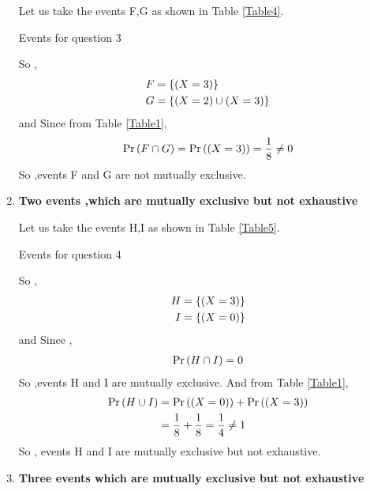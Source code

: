 \documentclass[journal,12pt,twocolumn]{IEEEtran}
\begin{document}
\begin{enumerate}[label=(\roman*)]
    Let us take the events F,G as shown in Table \ref{Table4}.
    \begin{table}[ht!]
        
        \caption{Events for question 3}
        \label{Table4}
    \end{table}
    So ,
    \begin{align}
        F &= \left\{(X=3)\right\} \\
	    G &=  \left\{(X=2) \cup (X=3)\right\}
    \end{align}
    and Since from Table \ref{Table1},
    \begin{align}
        \Pr\left(F \cap G\right) = \Pr\left((X=3)\right) = \dfrac{1}{8} \neq 0
    \end{align}
    So ,events F and G are not mutually exclusive.
  
    \item \textbf{Two events ,which are mutually exclusive but not exhaustive}
    
    Let us take the events H,I as shown in Table \ref{Table5}.
    \begin{table}[ht!]
        
        \caption{Events for question 4}
        \label{Table5}
    \end{table}
    So ,
    \begin{align}
        H &= \left\{ (X=3) \right\} \\
        I &= \left\{ (X=0) \right\}
    \end{align}
    and Since ,
    \begin{align}
        \Pr\left(H \cap I\right) = 0
    \end{align}
    So ,events H and I are mutually exclusive. And from Table \ref{Table1},
    \begin{align}
        \Pr\left(H \cup I\right) &= \Pr\left((X=0)\right) + \Pr\left((X=3)\right) \\
                      &= \dfrac{1}{8} + \dfrac{1}{8} = \dfrac{1}{4} \neq 1
    \end{align}
    So , events H and I are mutually exclusive but not exhaustive.
    
    \item \textbf{Three events which are mutually exclusive but not exhaustive}
    

\end{enumerate}
\end{document}
